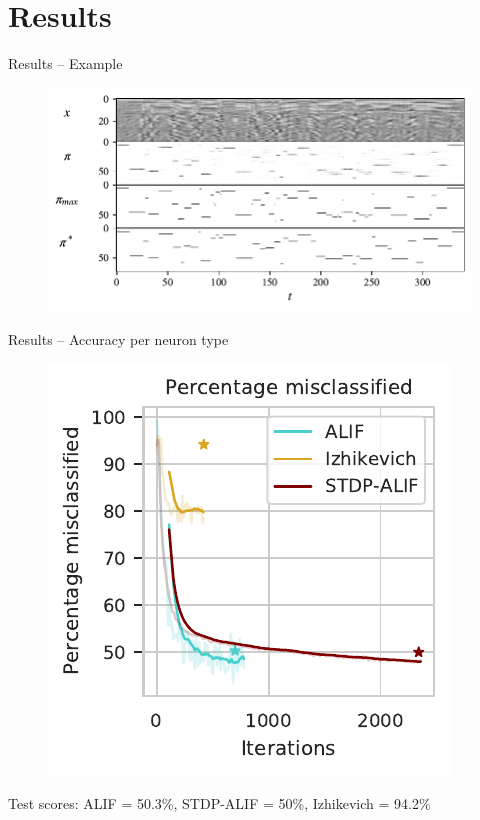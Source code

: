 \documentclass[t]{beamer}
\begin{document}
\section{Results}

\begin{frame}{Results -- Example}
  \begin{figure}[!ht]
    \centering
    \includegraphics[width=\linewidth]{InOutPair}
  \end{figure}
\end{frame}

\begin{frame}{Results -- Accuracy per neuron type}
  \begin{figure}[!ht]
    \centering
    \includegraphics[width=0.5\linewidth]{percwrong}
  \end{figure}
  Test scores: ALIF = 50.3\%, STDP-ALIF = 50\%, Izhikevich = 94.2\%
\end{frame}
\end{document}
